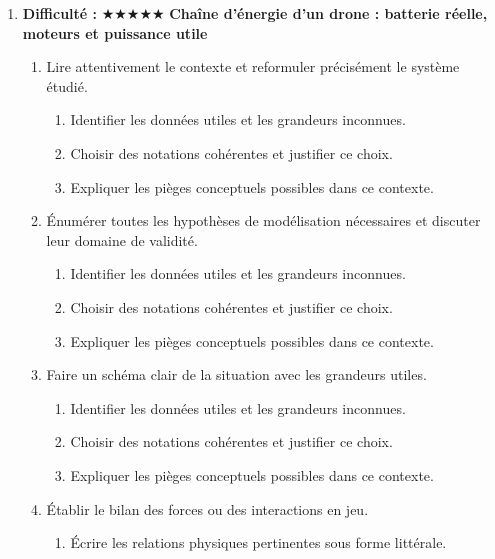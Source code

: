 \documentclass[11pt,a4paper]{article}
\newcommand{\etoiles}[1]{\textbf{Difficulté : }#1}
\begin{document}
\begin{enumerate}[label=\textbf{Très long \arabic*.},leftmargin=*]
\begin{enumerate}[label=\textbf{\arabic*)}]
\begin{enumerate}[label=\alph*)]
\item Comparer au moins deux scénarios différents.
\item Discuter la robustesse du résultat face à une variation de paramètre.
\item Proposer une ouverture vers une situation réelle plus complexe.
\end{enumerate}
\end{enumerate}
\item \etoiles{★★★★★}
\textbf{Chaîne d'énergie d'un drone : batterie réelle, moteurs et puissance utile}
\begin{enumerate}[label=\textbf{\arabic*)}]
\item Lire attentivement le contexte et reformuler précisément le système étudié.
\begin{enumerate}[label=\alph*)]
\item Identifier les données utiles et les grandeurs inconnues.
\item Choisir des notations cohérentes et justifier ce choix.
\item Expliquer les pièges conceptuels possibles dans ce contexte.
\end{enumerate}
\item Énumérer toutes les hypothèses de modélisation nécessaires et discuter leur domaine de validité.
\begin{enumerate}[label=\alph*)]
\item Identifier les données utiles et les grandeurs inconnues.
\item Choisir des notations cohérentes et justifier ce choix.
\item Expliquer les pièges conceptuels possibles dans ce contexte.
\end{enumerate}
\item Faire un schéma clair de la situation avec les grandeurs utiles.
\begin{enumerate}[label=\alph*)]
\item Identifier les données utiles et les grandeurs inconnues.
\item Choisir des notations cohérentes et justifier ce choix.
\item Expliquer les pièges conceptuels possibles dans ce contexte.
\end{enumerate}
\item Établir le bilan des forces ou des interactions en jeu.
\begin{enumerate}[label=\alph*)]
\item Écrire les relations physiques pertinentes sous forme littérale.

\end{enumerate}
\end{enumerate}
\end{enumerate}
\end{document}
